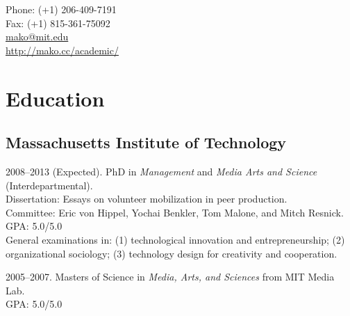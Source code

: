 \documentclass[10pt]{article}
\makeatletter
\def\myemail{mako@mit.edu}
\def\myweb{http://mako.cc/academic/}
\def\myphone{(+1) 206-409-7191}
\def\myfax{(+1) 815-361-75092}
\newenvironment{cvlist}{
\begin{list}{}{\leftmargin=3.0em \itemindent=-3.0em}
  \setlength{\itemsep}{0pt}
  \setlength{\parskip}{0em}
  \setlength{\parsep}{1em}
  \setlength{\parindent}{0em}}
{\vspace{1em}
\end{list}}
\makeatother
\begin{document}
\pagestyle{fancy}
\renewcommand{\headrulewidth}{0pt}
\fancyhead{}
\fancyfoot{}
\rhead{{\scriptsize\thepage}}


\begin{minipage}[t]{3in}
  
\end{minipage}
\hfill     
\begin{minipage}[t]{0.0in}
\end{minipage}
\hfill
\begin{minipage}[t]{1.7in}
  \flushright \footnotesize Phone: \myphone \\ 
  Fax: \myfax \\ 
  {\scriptsize \href{mailto:\myemail}{\myemail}} \\
  {\scriptsize  \href{\myweb}{\myweb}}
\end{minipage}

\medskip


\medskip

\section{Education}

\subsection{Massachusetts Institute of Technology}
\begin{cvlist}

\item 2008--2013 (Expected). PhD in \emph{Management} and \emph{Media
    Arts and Science} (Interdepartmental). \\
  Dissertation: Essays on volunteer mobilization in peer production. \\
  Committee: Eric von Hippel, Yochai Benkler, Tom Malone, and
  Mitch Resnick. \\
  GPA: 5.0/5.0 \\
  General examinations in: (1) technological innovation and
  entrepreneurship; (2) organizational sociology; (3) technology
  design for creativity and cooperation.

\item 2005--2007. Masters of Science in \emph{Media, Arts, and
    Sciences} from MIT Media Lab.\\ GPA: 5.0/5.0

\end{cvlist}
\end{document}
